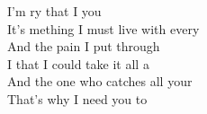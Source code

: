 I'm ry that I  you \\
It's mething I must live with every \\
And  the pain I put  through \\
I  that I could take it all a \\
And  the one who catches all your  \\
\songwordfb{} That's why I need you to  \\
